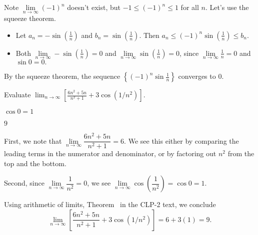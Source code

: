 \begin{solution}
Note $\lim\limits_{n\to \infty} (-1)^n$ doesn't exist, but $-1 \leq (-1)^n\leq 1$ for all $n$. Let's use the squeeze theorem.
\begin{itemize}
\item Let $a_n=-\sin\left(\frac{1}{n}\right)$ and $b_n=\sin\left(\frac{1}{n}\right)$. Then
$a_n\leq (-1)^n\sin\left(\frac{1}{n}\right) \leq b_n$.
\item Both $\lim\limits_{n \to \infty} -\sin\left(\frac{1}{n}\right)=0$ and $\lim\limits_{n \to \infty} \sin\left(\frac{1}{n}\right)=0$, since $\lim\limits_{n \to \infty} \frac{1}{n}=0$ and $\sin 0=0.$
\end{itemize}
By the squeeze theorem,
the sequence $\left\{(-1)^n\sin\frac{1}{n}\right\}$ converges to $0$.
\end{solution}

\begin{Mquestion}[2016Q5]
Evaluate
$
\displaystyle\lim_{n\rightarrow\infty}\left[\frac{6n^2+5n}{n^2+1} +3\cos(1/n^2) \right]
$.
\end{Mquestion}

\begin{hint}
$\cos 0 =1$
\end{hint}

\begin{answer}
$9$
\end{answer}

\begin{solution}
First, we note that $\lim\limits_{n \to \infty}\dfrac{6n^2+5n}{n^2+1}=6$. We see this either by comparing the leading terms in the numerator and denominator, or by factoring out $n^2$ from the top and the bottom.

Second, since $\lim\limits_{n \to \infty}\dfrac{1}{n^2}=0$, we see
$\lim\limits_{n \to \infty}\cos\left(\dfrac{1}{n^2}\right)=\cos0=1$.

Using
arithmetic of limits,
Theorem~ in the CLP-2 text, we conclude
\[
\displaystyle\lim_{n\rightarrow\infty}\left[\frac{6n^2+5n}{n^2+1} +3\cos(1/n^2) \right]
=6+3(1)=9.
\]

\end{solution}






\subsection*{\Application}


